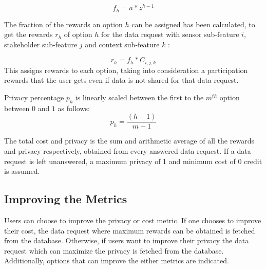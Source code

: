\begin{equation}
f_{h} = a * z^{h-1}
\end{equation}

The fraction of the rewards an option $h$ can be assigned has been calculated, to get the rewards $r_{h}$ of option $h$ for the data request with sensor sub-feature $i$, stakeholder sub-feature $j$ and
context sub-feature $k$ :

\begin{equation}
r_{h} = f_{h} * C_{i,j,k}
\end{equation}
This assigns rewards to each option, taking into consideration a participation rewards that the user gets even if data is not shared for that data request.

Privacy percentage $p_{h}$ is linearly scaled between the first to the $m^{th}$ option between $0$ and $1$ as follows:
\begin{equation}
p_{h} = \frac{(h-1)}{m-1}
\end{equation}

The total cost and privacy is the sum and arithmetic average of all the rewards and privacy respectively, obtained from every answered data request. If a data request is left unanswered, a maximum privacy of 1 and minimum cost of 0 credit is assumed.


\subsection{Improving the Metrics}
Users can choose to improve the privacy or cost metric. If one chooses to improve their cost, the data request where maximum rewards can be obtained is fetched from the database. Otherwise, if users want to improve their privacy the data request which can maximize the privacy is fetched from the database. Additionally, options that can improve the either metrics are indicated.


